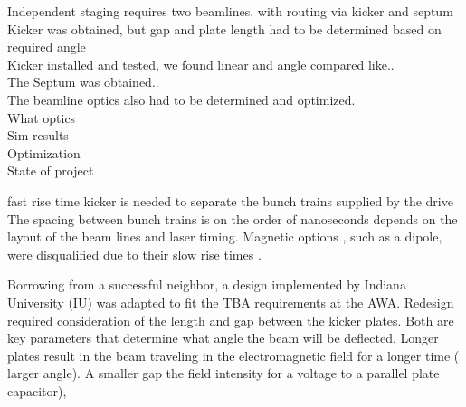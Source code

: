 


Independent staging requires two beamlines, with routing via kicker and septum\\
Kicker was obtained, but gap and plate length had to be determined based on required angle\\
Kicker installed and tested, we found linear and angle compared like..\\
The Septum was obtained..\\
The beamline optics also had to be determined and optimized.\\
What optics \\
Sim results\\
Optimization\\
State of project\\



 fast rise time kicker is needed to separate the 
bunch trains supplied by the drive  The spacing between bunch trains is on the 
order of nanoseconds depends on the layout of the beam lines and laser timing.  
Magnetic options , such as a dipole, were disqualified due to their slow rise times 
. 

Borrowing from a successful neighbor, a design implemented by Indiana University (IU) \cite{iukicker}
was adapted to fit the TBA requirements at the AWA. Redesign required consideration
of the length and gap between the kicker plates. Both are key parameters that determine 
what angle the beam will be deflected. Longer plates result in the beam traveling 
in the electromagnetic field for a longer  time ( larger  angle). 
A smaller gap  the field intensity for a  voltage  to a parallel plate 
capacitor), 


